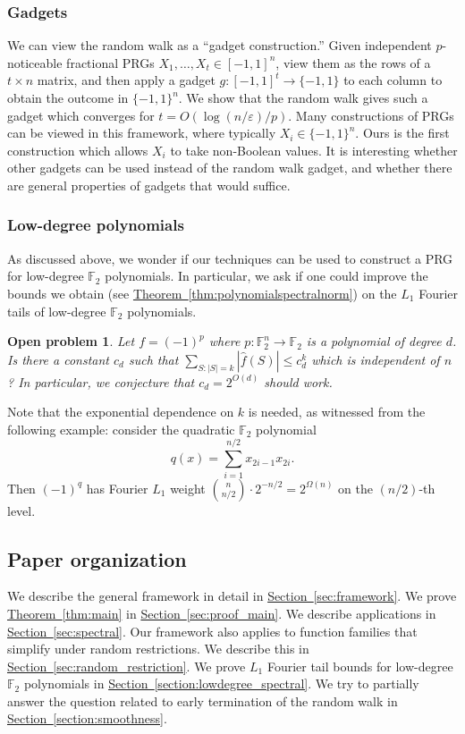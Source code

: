 \documentclass[11pt]{article}
\numberwithin{equation}{section}
\theoremstyle{definition}
\theoremstyle{plain}
\newcommand{\expref}[2]{\hyperref[#2]{#1~\ref{#2}}}
\newcommand{\F}{\mathbb{F}}
\newcommand{\eps}{\varepsilon}
\newtheorem{open}[theorem]{Open problem}
\begin{document}
\subsubsection{Gadgets}
We can view the random walk as a ``gadget construction.'' Given independent $p$-noticeable fractional PRGs
$X_1,\ldots,X_t \in [-1,1]^n$, view them as the rows of a $t \times n$ matrix, and then apply a gadget $g:[-1,1]^t \to \{-1,1\}$
to each column to obtain the outcome in $\{-1,1\}^n$. We show that the random walk gives such a gadget which converges for $t=O(\log(n/\eps)/p)$.
Many constructions of PRGs can be viewed in this framework, where typically $X_i \in \{-1,1\}^n$. Ours is the first construction which allows
$X_i$ to take non-Boolean values. It is interesting whether other gadgets can be used instead of the random walk gadget, and whether there are
general properties of gadgets that would suffice.

\subsubsection{Low-degree polynomials}
As discussed above, we wonder if our techniques can be used to construct a PRG for low-degree $\F_2$ polynomials. In particular, we ask if one could improve the bounds we obtain (see \expref{Theorem}{thm:polynomialspectralnorm}) on the $L_1$ Fourier tails of low-degree $\F_2$ polynomials.

\begin{open}
 Let $f=(-1)^p$ where $p:\F_2^n \to \F_2$ is a polynomial of degree $d$. Is there a constant $c_d$ such that  $\sum_{S : |S|=k} |\hat{f}(S)| \le c_d^{k}$
which is independent of $n$? In particular, we conjecture
that $c_d=2^{O(d)}$ should work.
\end{open}
Note that the exponential dependence on $k$ is needed,
as witnessed from the following example: consider the quadratic $\F_2$ polynomial
\[
  q(x)=\sum_{i=1}^{n/2}x_{2i-1}x_{2i}.
\]
Then $(-1)^{q}$ has Fourier $L_1$ weight
$\binom{n}{n/2} \cdot 2^{-n/2} = 2^{\Omega(n)}$ on the $(n/2)$-th
level.

%
%
%
%
%
%
%

%
%
%
%
%

%
%


\subsection{Paper organization}
We describe the general framework in detail in \expref{Section}{sec:framework}. We prove \expref{Theorem}{thm:main} in \expref{Section}{sec:proof_main}. We describe
applications in \expref{Section}{sec:spectral}. Our framework also applies to function families that simplify under random restrictions. We describe this in \expref{Section}{sec:random_restriction}. We prove $L_1$ Fourier tail bounds for low-degree $\F_2$ polynomials in \expref{Section}{section:lowdegree_spectral}. We try to partially answer the question related to early termination of the random walk in \expref{Section}{section:smoothness}.
\end{document}
